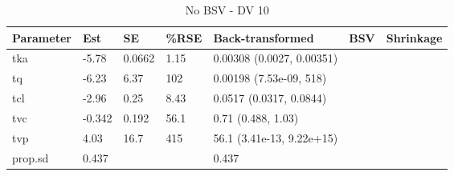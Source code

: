 \begin{table}
\centering\centering
\caption{No BSV - DV 10}
\centering
\fontsize{8}{10}\selectfont
\begin{tabular}[t]{lllllll}
\toprule
\textbf{Parameter} & \textbf{Est} & \textbf{SE} & \textbf{\%RSE} & \textbf{Back-transformed} & \textbf{BSV} & \textbf{Shrinkage}\\
\midrule
tka & -5.78 & 0.0662 & 1.15 & 0.00308 (0.0027, 0.00351) &  & \\
\midrule
tq & -6.23 & 6.37 & 102 & 0.00198 (7.53e-09, 518) &  & \\
\midrule
tcl & -2.96 & 0.25 & 8.43 & 0.0517 (0.0317, 0.0844) &  & \\
\midrule
tvc & -0.342 & 0.192 & 56.1 & 0.71 (0.488, 1.03) &  & \\
\midrule
tvp & 4.03 & 16.7 & 415 & 56.1 (3.41e-13, 9.22e+15) &  & \\
\midrule
prop.sd & 0.437 &  &  & 0.437 &  & \\
\bottomrule
\end{tabular}
\end{table}